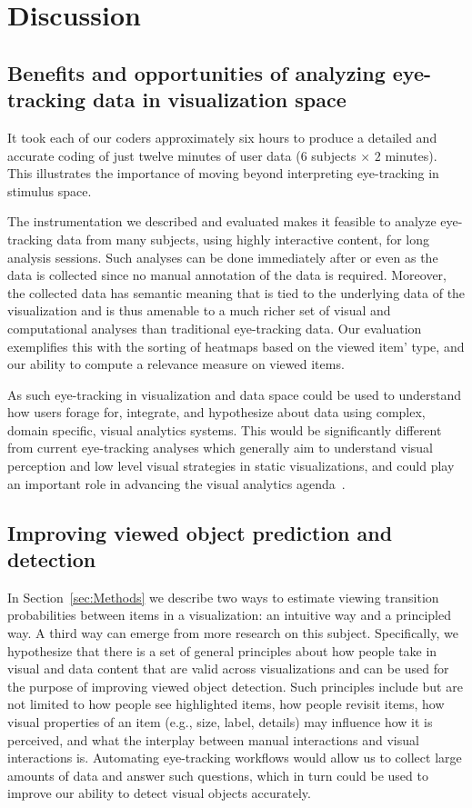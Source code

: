 ﻿\section{Discussion}
\label{sec:Discussion}
\subsection{Benefits and opportunities of analyzing eye-tracking data in visualization space}

It took each of our coders approximately six hours to produce a detailed and accurate coding of just twelve minutes of user data ($6$ subjects $\times$ $2$ minutes). This illustrates the importance of moving beyond interpreting eye-tracking in stimulus space.

The instrumentation we described and evaluated makes it feasible to analyze eye-tracking data from many subjects, using highly interactive content, for long analysis sessions. Such analyses can be done immediately after or even as the data is collected since no manual annotation of the data is required. Moreover, the collected data has semantic meaning that is tied to the underlying data of the visualization and is thus amenable to a much richer set of visual and computational analyses than traditional eye-tracking data. Our evaluation exemplifies this with the sorting of heatmaps based on the viewed item' type, and our ability to compute a relevance measure on viewed items. 

As such eye-tracking in visualization and data space could be used to understand how users forage for, integrate, and hypothesize about data using complex, domain specific, visual analytics systems. This would be significantly different from current eye-tracking analyses which generally aim to understand visual perception and low level visual strategies in static visualizations, and could play an important role in advancing the visual analytics agenda~\cite{thomas2006visual}. 

\subsection{Improving viewed object prediction and detection} 

In Section~\ref{sec:Methods} we describe two ways to estimate viewing transition probabilities between items in a visualization: an intuitive way and a principled way. A third way can emerge from more research on this subject. Specifically, we hypothesize that there is a set of general principles about how people take in visual and data content that are valid across visualizations and can be used for the purpose of improving viewed object detection. Such principles include but are not limited to how people see highlighted items, how people revisit items, how visual properties of an item (e.g., size, label, details) may influence how it is perceived, and what the interplay between manual interactions and visual interactions is. Automating eye-tracking workflows would allow us to collect large amounts of data and answer such questions, which in turn could be used to improve our ability to detect visual objects accurately.  


